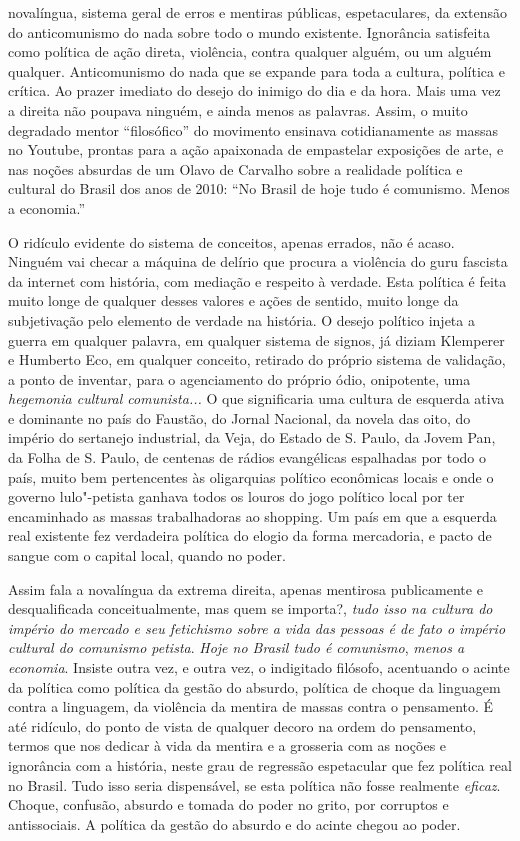 novalíngua, sistema geral de erros e mentiras públicas, espetaculares,
da extensão do anticomunismo do nada sobre todo o mundo existente.
Ignorância satisfeita como política de ação direta, violência, contra
qualquer alguém, ou um alguém qualquer. Anticomunismo do nada que se
expande para toda a cultura, política e crítica. Ao prazer imediato do
desejo do inimigo do dia e da hora. Mais uma vez a direita não poupava
ninguém, e ainda menos as palavras. Assim, o muito degradado mentor
``filosófico'' do movimento ensinava cotidianamente as massas no
Youtube, prontas para a ação apaixonada de empastelar exposições de
arte, e nas noções absurdas de um Olavo de Carvalho sobre a realidade
política e cultural do Brasil dos anos de 2010: ``No Brasil de hoje tudo
é comunismo. Menos a economia.''

O ridículo evidente do sistema de conceitos, apenas errados, não é
acaso. Ninguém vai checar a máquina de delírio que procura a violência
do guru fascista da internet com história, com mediação e respeito à
verdade. Esta política é feita muito longe de qualquer desses valores e
ações de sentido, muito longe da subjetivação pelo elemento de verdade
na história. O desejo político injeta a guerra em qualquer palavra, em
qualquer sistema de signos, já diziam Klemperer e Humberto Eco, em
qualquer conceito, retirado do próprio sistema de validação, a ponto de
inventar, para o agenciamento do próprio ódio, onipotente, uma
\emph{hegemonia cultural comunista...} O que significaria uma cultura de
esquerda ativa e dominante no país do Faustão, do Jornal Nacional, da
novela das oito, do império do sertanejo industrial, da Veja, do Estado
de S. Paulo, da Jovem Pan, da Folha de S. Paulo, de centenas de rádios
evangélicas espalhadas por todo o país, muito bem pertencentes às
oligarquias político econômicas locais e onde o governo lulo"-petista
ganhava todos os louros do jogo político local por ter encaminhado as
massas trabalhadoras ao shopping. Um país em que a esquerda real
existente fez verdadeira política do elogio da forma mercadoria, e pacto
de sangue com o capital local, quando no poder.

Assim fala a novalíngua da extrema direita, apenas mentirosa
publicamente e desqualificada conceitualmente, mas quem se importa?,
\emph{tudo isso na cultura do império do mercado e seu fetichismo sobre
a vida das pessoas é de fato o império cultural do comunismo petista}.
\emph{Hoje no Brasil tudo é comunismo}, \emph{menos a economia}. Insiste
outra vez, e outra vez, o indigitado filósofo, acentuando o acinte da
política como política da gestão do absurdo, política de choque da
linguagem contra a linguagem, da violência da mentira de massas contra o
pensamento. É até ridículo, do ponto de vista de qualquer decoro na
ordem do pensamento, termos que nos dedicar à vida da mentira e a
grosseria com as noções e ignorância com a história, neste grau de
regressão espetacular que fez política real no Brasil. Tudo isso seria
dispensável, se esta política não fosse realmente \emph{eficaz}. Choque,
confusão, absurdo e tomada do poder no grito, por corruptos e
antissociais. A política da gestão do absurdo e do acinte chegou ao
poder.

